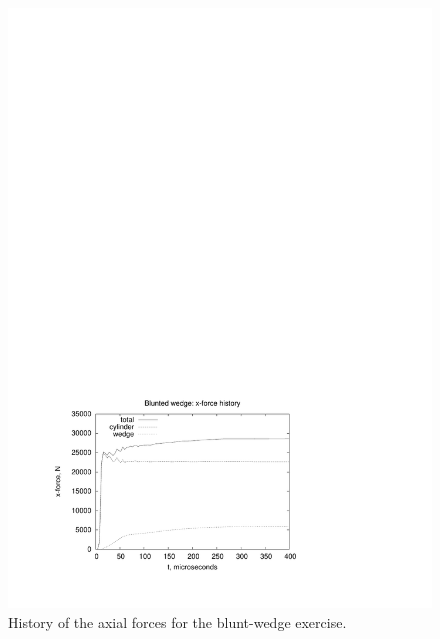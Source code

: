 \begin{figure}[htbp]
\begin{center}
\includegraphics[width=12cm,viewport=66 52 404 292,clip=true]{../2D/blunt-wedge/bw_xforce.pdf}
\end{center}
\caption{History of the axial forces for the blunt-wedge exercise.}
\label{bw-xforce-fig}
\end{figure}


